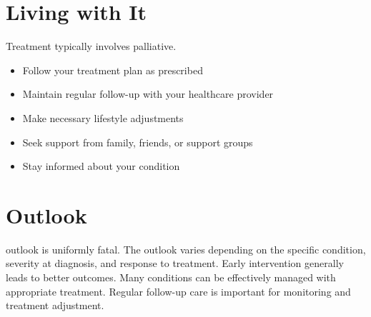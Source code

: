 \section{Living with It}
Treatment typically involves palliative.

\begin{itemize}[noitemsep]
  \item Follow your treatment plan as prescribed
  \item Maintain regular follow-up with your healthcare provider
  \item Make necessary lifestyle adjustments
  \item Seek support from family, friends, or support groups
  \item Stay informed about your condition
\end{itemize}
\section{Outlook}
outlook is uniformly fatal. The outlook varies depending on the specific condition, severity at diagnosis, and response to treatment. Early intervention generally leads to better outcomes. Many conditions can be effectively managed with appropriate treatment. Regular follow-up care is important for monitoring and treatment adjustment.
